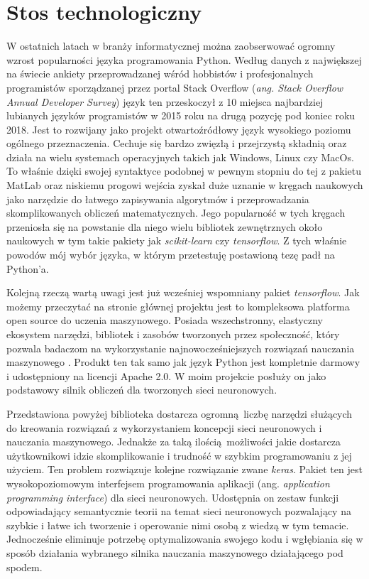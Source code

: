 \documentclass[12pt, oneside, a4paper]{report}
\begin{document}
\section{Stos technologiczny}

W ostatnich latach w branży informatycznej można zaobserwować ogromny wzrost popularności języka programowania Python. Według danych z największej na świecie ankiety przeprowadzanej wśród hobbistów i profesjonalnych programistów sporządzanej przez portal Stack Overflow (\textit{ang. Stack Overflow Annual Developer Survey}) \citep{stackoverflow-survey} język ten przeskoczył z 10 miejsca najbardziej lubianych języków programistów w 2015 roku na drugą pozycję pod koniec roku 2018. Jest to rozwijany jako projekt otwartoźródłowy język wysokiego poziomu ogólnego przeznaczenia. Cechuje się bardzo zwięzłą i przejrzystą składnią oraz działa na wielu systemach operacyjnych takich jak Windows, Linux czy MacOs. To właśnie dzięki swojej syntaktyce podobnej w pewnym stopniu do tej z pakietu MatLab oraz niskiemu progowi wejścia zyskał duże uznanie w kręgach naukowych jako narzędzie do łatwego zapisywania algorytmów i przeprowadzania skomplikowanych obliczeń matematycznych. Jego popularność w tych kręgach przeniosła się na powstanie dla niego wielu bibliotek zewnętrznych około naukowych w tym takie pakiety jak \textit{scikit-learn} czy \textit{tensorflow}. Z tych właśnie powodów mój wybór języka, w którym przetestuję postawioną tezę padł na Python'a.

Kolejną rzeczą wartą uwagi jest już wcześniej wspomniany pakiet \textit{tensorflow}. Jak możemy przeczytać na stronie głównej projektu jest to kompleksowa platforma open source do uczenia maszynowego. Posiada wszechstronny, elastyczny ekosystem narzędzi, bibliotek i zasobów tworzonych przez społeczność, który pozwala badaczom na wykorzystanie najnowocześniejszych rozwiązań nauczania maszynowego \citep{tensorflow-wesite}. Produkt ten tak samo jak język Python jest kompletnie darmowy i udostępniony na licencji Apache 2.0. W moim projekcie posłuży on jako podstawowy silnik obliczeń dla tworzonych sieci neuronowych.

Przedstawiona powyżej biblioteka dostarcza ogromną liczbę narzędzi służących do kreowania rozwiązań z wykorzystaniem koncepcji sieci neuronowych i nauczania maszynowego. Jednakże za taką ilością możliwości jakie dostarcza użytkownikowi idzie skomplikowanie i trudność w szybkim programowaniu z jej użyciem. Ten problem rozwiązuje kolejne rozwiązanie zwane \textit{keras}. Pakiet ten jest wysokopoziomowym interfejsem programowania aplikacji (ang. \textit{application programming interface}) dla sieci neuronowych. Udostępnia on zestaw funkcji odpowiadający semantycznie teorii na temat sieci neuronowych pozwalający na szybkie i łatwe ich tworzenie i operowanie nimi osobą z wiedzą w tym temacie. Jednocześnie eliminuje potrzebę optymalizowania swojego kodu i wgłębiania się w sposób działania wybranego silnika nauczania maszynowego działającego pod spodem.
\end{document}
